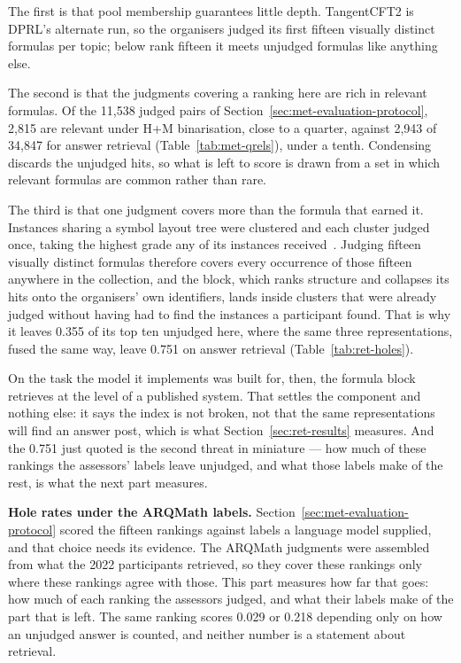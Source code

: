 The first is that pool membership guarantees little depth. TangentCFT2 is DPRL's alternate run,
so the organisers judged its first fifteen visually distinct formulas per topic; below rank
fifteen it meets unjudged formulas like anything else.

The second is that the judgments covering a ranking here are rich in relevant formulas. Of the
11{,}538 judged pairs of Section~\ref{sec:met-evaluation-protocol}, 2{,}815 are relevant under
H+M binarisation, close to a quarter, against 2{,}943 of 34{,}847 for answer retrieval
(Table~\ref{tab:met-qrels}), under a tenth. Condensing discards the unjudged hits, so what is
left to score is drawn from a set in which relevant formulas are common rather than rare.

The third is that one judgment covers more than the formula that earned it. Instances sharing a
symbol layout tree were clustered and each cluster judged once, taking the highest grade any of
its instances received~\cite{mansouri2021effects}. Judging fifteen visually distinct formulas
therefore covers every occurrence of those fifteen anywhere in the collection, and the block,
which ranks structure and collapses its hits onto the organisers' own identifiers, lands inside
clusters that were already judged without having had to find the instances a participant found.
That is why it leaves 0.355 of its top ten unjudged here, where the same three representations,
fused the same way, leave 0.751 on answer retrieval (Table~\ref{tab:ret-holes}).

On the task the model it implements was built for, then, the formula block retrieves at the
level of a published system. That settles the component and nothing else: it says the index is
not broken, not that the same representations will find an answer post, which is what
Section~\ref{sec:ret-results} measures. And the 0.751 just quoted is the second threat in
miniature --- how much of these rankings the assessors' labels leave unjudged, and what those
labels make of the rest, is what the next part measures.

\textbf{Hole rates under the ARQMath labels.}
Section~\ref{sec:met-evaluation-protocol} scored the fifteen rankings against labels a
language model supplied, and that choice needs its evidence. The ARQMath judgments were
assembled from what the 2022 participants retrieved, so they cover these rankings only
where these rankings agree with those. This part measures how far that goes: how much
of each ranking the assessors judged, and what their labels make of the part that is left.
The same ranking scores 0.029 or 0.218 depending only on how an unjudged answer is counted,
and neither number is a statement about retrieval.

